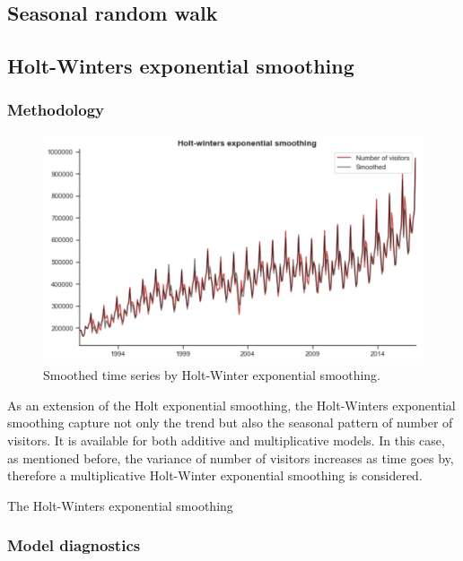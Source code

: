 \documentclass[letterpaper,12pt,twoside,]{pinp}
\begin{document}
\hypertarget{seasonal-random-walk}{%
\subsection{Seasonal random walk}\label{seasonal-random-walk}}

\hypertarget{holt-winters-exponential-smoothing}{%
\subsection{Holt-Winters exponential
smoothing}\label{holt-winters-exponential-smoothing}}

\hypertarget{methodology-1}{%
\subsubsection{Methodology}\label{methodology-1}}

\begin{figure}
\includegraphics[width=1\linewidth]{HW_es.png}
\centering
\caption{Smoothed time series by Holt-Winter exponential smoothing.}
\label{fig:hw_es}
\end{figure}

As an extension of the Holt exponential smoothing, the Holt-Winters
exponential smoothing capture not only the trend but also the seasonal
pattern of number of visitors. It is available for both additive and
multiplicative models. In this case, as mentioned before, the variance
of number of visitors increases as time goes by, therefore a
multiplicative Holt-Winter exponential smoothing is considered.

The Holt-Winters exponential smoothing

\hypertarget{model-diagnostics}{%
\subsubsection{Model diagnostics}\label{model-diagnostics}}
\end{document}
